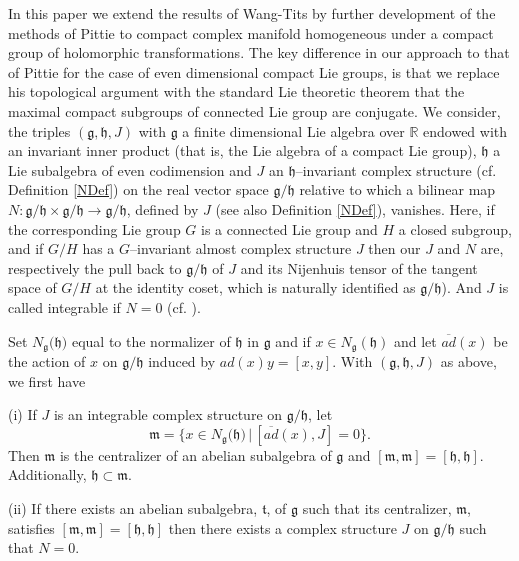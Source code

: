 \documentclass{amse-new}
\numberwithin{equation}{section} %
\begin{document}
In this paper we extend the results of Wang-Tits by further development of the
methods of Pittie to compact complex manifold homogeneous under a compact
group of holomorphic transformations. The key difference in our approach to
that of Pittie for the case of even dimensional compact Lie groups, is that we
replace his topological argument with the standard Lie theoretic theorem that
the maximal compact subgroups of connected Lie group are conjugate. We
consider, the triples $(\mathfrak{g,\mathfrak{h}},J)$ with $\mathfrak{g}$ a
finite dimensional Lie algebra over $\mathbb{R}$ endowed with an invariant
inner product (that is, the Lie algebra of a compact Lie group),
$\mathfrak{\mathfrak{h}}$ a Lie subalgebra of even codimension and $J$ an
$\mathfrak{h}$--invariant complex structure (cf. Definition \ref{NDef}) on the
real vector space $\mathfrak{g}/\mathfrak{h}$ relative to which a bilinear map
$N:\mathfrak{g}/\mathfrak{h}\times\mathfrak{g}/\mathfrak{h}\rightarrow
\mathfrak{g}/\mathfrak{h}$, defined by $J$ (see also Definition \ref{NDef}),
vanishes. Here, if the corresponding Lie group $G$ is a connected Lie group
and $H$ a closed subgroup, and if $G/H$ has a $G$--invariant almost complex
structure $J$ then our $J$ and $N$ are, respectively the pull back to
$\mathfrak{g}/\mathfrak{h}$ of $J$ and its Nijenhuis tensor of the tangent
space of $G/H$ at the identity coset, which is naturally identified as
$\mathfrak{g}/\mathfrak{h}$). And $J$ is called integrable if $N=0$ (cf.
\cite{Kos}).

Set $N_{\mathfrak{g}}(\mathfrak{h)}$ equal to the normalizer of $\mathfrak{h}
$ in $\mathfrak{g}$ and if $x\in N_{\mathfrak{g}}(\mathfrak{h})$ and let
$\overline{ad}(x)$ be the action of $x$ on $\mathfrak{g}/\mathfrak{h}$ induced
by $ad(x)y=[x,y]$. With $(\mathfrak{g}, \mathfrak{h}, J)$ as above, we first have

\begin{theorem}
\label{thm:main1-wang} (i) If $J$ is an integrable complex structure on
$\mathfrak{g}/\mathfrak{h}$, let $$\mathfrak{m}=\{x\in N_{\mathfrak{g}%
}(\mathfrak{h)}\, |\, [\overline{ad}(x),J]=0\}.$$ Then $\mathfrak{m}$ is the
centralizer of an abelian subalgebra of $\mathfrak{g}$ and $[\mathfrak{m}%
,\mathfrak{m}]=[\mathfrak{h},\mathfrak{h}]$. Additionally, $\mathfrak{h}%
\subset\mathfrak{m}$.

(ii) If there exists an abelian subalgebra, $\mathfrak{t}$, of $\mathfrak{g}$
such that its centralizer, $\mathfrak{m}$, satisfies $[\mathfrak{m}%
,\mathfrak{m}]=[\mathfrak{h},\mathfrak{h}]$ then there exists a complex
structure $J$ on $\mathfrak{g}/\mathfrak{h}$ such that $N=0$.
\end{theorem}
\end{document}
